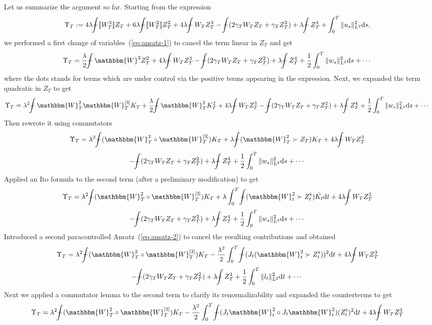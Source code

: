 \documentclass[11pt, oneside]{article}   	%
\newcommand{\assign}{:=}
\newcommand{\mathd}{\mathrm{d}}
\def\Xint#1{\mathchoice
{\XXint\displaystyle\textstyle{#1}}%
{\XXint\textstyle\scriptstyle{#1}}%
{\XXint\scriptstyle\scriptscriptstyle{#1}}%
{\XXint\scriptscriptstyle\scriptscriptstyle{#1}}%
\!\int}
\def\XXint#1#2#3{{\setbox0=\hbox{$#1{#2#3}{\int}$ }
\vcenter{\hbox{$#2#3$ }}\kern-.6\wd0}}
\def\dashint{\Xint-}
\newcommand{\bint}{\dashint}
\begin{document}
Let us summarize the argument so far. Starting from the expression
\[ \Upsilon_T \assign 4 \lambda \bint \llbracket W_T^3 \rrbracket Z_T + 6
   \lambda \bint \llbracket W_T^2 \rrbracket Z_T^2 + 4 \lambda \bint W_T Z_T^3
   - \bint (2 \gamma_T W_T Z_T + \gamma_T Z_T^2) + \lambda \bint  Z_T^4 +
   \int_0^T \| u_s \|^2_{L^2} \mathd s, \]
we performed a first change of variables~(\ref{eq:ansatz-1}) to cancel the
term linear in $Z_T$ and get
\[ \Upsilon_T = \frac{\lambda}{2} \bint \mathbbm{W}^2 Z_T^2 + 4 \lambda \bint
   W_T Z_T^3 - \bint (2 \gamma_T W_T Z_T + \gamma_T Z_T^2) + \lambda \bint 
   Z_T^4 + \frac{1}{2} \int_0^T \| w_s \|^2_{L^2} \mathd s + \cdots \]
where the dots stands for terms which are under control via the positive terms
appearing in the expression. Next, we expanded the term quadratic in $Z_T$ to
get
\[ \Upsilon_T = \lambda^2 \bint \mathbbm{W}^2_T \mathbbm{W}_T^{[3]} K_T +
   \frac{\lambda}{2} \bint \mathbbm{W}^2_T K_T^2 + 4 \lambda \bint W_T Z_T^3 -
   \bint (2 \gamma_T W_T Z_T + \gamma_T Z_T^2) + \lambda \bint  Z_T^4 +
   \frac{1}{2} \int_0^T \| w_s \|^2_{L^2} \mathd s + \cdots \]
Then rewrote it using commutators
\[ \Upsilon_T = \lambda^2 \bint (\mathbbm{W}^2_T \circ \mathbbm{W}_T^{[3]})
   K_T + \lambda \bint (\mathbbm{W}^2_T \succ Z_T) K_T + 4 \lambda \bint W_T
   Z_T^3 \]
\[ - \bint (2 \gamma_T W_T Z_T + \gamma_T Z_T^2) + \lambda \bint  Z_T^4 +
   \frac{1}{2} \int_0^T \| w_s \|^2_{L^2} \mathd s + \cdots \]
Applied an Ito formula to the second term (after a preliminary modification)
to get
\[ \Upsilon_T = \lambda^2 \bint (\mathbbm{W}^2_T \circ \mathbbm{W}_T^{[3]})
   K_T + \lambda \int_0^T \bint (\mathbbm{W}^2_t \succ Z^{\flat}_t) \dot{K_t}
   \mathd t + 4 \lambda \bint W_T Z_T^3 \]
\[ - \bint (2 \gamma_T W_T Z_T + \gamma_T Z_T^2) + \lambda \bint  Z_T^4 +
   \frac{1}{2} \int_0^T \| w_s \|^2_{L^2} \mathd s + \cdots \]
Introduced a second paracontrolled Ansatz~(\ref{eq:ansatz-2}) to cancel the
resulting contributions and obtained
\[ \Upsilon_T = \lambda^2 \bint (\mathbbm{W}^2_T \circ \mathbbm{W}_T^{[3]})
   K_T - \frac{\lambda^2}{2} \int_0^T \bint (J_t (\mathbbm{W}^2_t \succ
   Z^{\flat}_t))^2 \mathd t + 4 \lambda \bint W_T Z_T^3 \]
\[ - \bint (2 \gamma_T W_T Z_T + \gamma_T Z_T^2) + \lambda \bint  Z_T^4 +
   \frac{1}{2} \int_0^T \| l_t \|^2_{L^2} \mathd t + \cdots \]
Next we applied a commutator lemma to the second term to clarify its
renormalizability and expanded the counterterms to get
\[ \Upsilon_T = \lambda^2 \bint (\mathbbm{W}^2_T \circ \mathbbm{W}_T^{[3]})
   K_T - \frac{\lambda^2}{2} \int_0^T \bint (J_t \mathbbm{W}^2_t \circ J_t
   \mathbbm{W}^2_t) (Z^{\flat}_t)^2 \mathd t + 4 \lambda \bint W_T Z_T^3 \]
\end{document}
